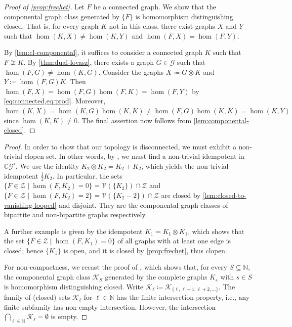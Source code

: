 \documentclass[11pt]{scrartcl}
\theoremstyle{definition}
\theoremstyle{plain}
\theoremstyle{remark}
\newcommand{\lG}{\mathcal{G}^\circ}
\newcommand{\G}{\mathcal{G}}
\newcommand{\Z}{\mathcal{Z}}
\begin{document}
    
	\begin{proof}[Proof of \cref{prop:frechet}]
		Let $F$ be a connected graph.
		We show that the componental graph class generated by $\{F\}$ is homomorphism distinguishing closed.
		That is, for every graph $K$ not in this class, there exist graphs $X$ and $Y$ such that $\hom(K, X) \neq \hom(K, Y)$ and $\hom(F, X) = \hom(F, Y)$.
		
		By \cref{lem:cl-componental}, it suffices to consider a connected graph $K$ such that $F \not\cong K$.
		By \cref{thm:dual-lovasz},
		there exists a graph $G \in \G$ such that $\hom(F, G) \neq \hom(K, G)$.
		Consider the graphs $X \coloneqq G \otimes K$ and $Y \coloneqq \hom(F, G) K$.
		Then $\hom(F, X) = \hom(F, G) \hom(F, K) = \hom(F, Y)$ by \cref{eq:connected,eq:prod}.
		Moreover, $\hom(K, X) = \hom(K, G) \hom(K, K) \neq \hom(F, G) \hom(K, K) = \hom(K, Y)$
		since $\hom(K, K) \neq 0$.
		The final assertion now follows from \cref{lem:componental-closed}. 
	\end{proof}
    \propDisconnected*
	\begin{proof}
		In order to show that our topology is disconnected, we must exhibit a non-trivial clopen set. 
		In other words, by \cite[Lemma 1.1]{milne_basic_2012}, we must find a non-trivial idempotent in $\mathbb{C}\lG$.
		We use the identity $K_2 \otimes K_2 = K_2 + K_2$, which yields the non-trivial idempotent $\frac12 K_2$. In particular, the sets $\{F \in \Z \mid \hom(F, K_2) = 0\} = \mathcal{V}(\{K_2\}) \cap \Z$ and $\{F \in \Z  \mid \hom(F, K_2) = 2\} = \mathcal{V}(\{K_2 - 2\}) \cap \Z$ are closed by \cref{lem:closed-to-vanishing-looped} and disjoint. They are the componental graph classes of bipartite and non-bipartite graphs respectively.

		A further example is given by the idempotent $K_1 = K_1 \otimes K_1$, which shows that the set  $\{F \in \Z \mid \hom(F, K_1) = 0\}$ of all graphs with at least one edge is closed; hence $\{K_1\}$ is open, and it is closed by \cref{prop:frechet}, thus clopen.

		For non-compactness, we recast the proof of \cite[Theorem~6.15]{roberson_oddomorphisms_2022}, which shows that, for every $S \subseteq \mathbb{N}$, the componental graph class $\mathcal{K}_S$ generated by the complete graphs $K_s$ with $s \in S$ is homomorphism distinguishing closed.
		Write $\mathcal{K}_\ell \coloneqq \mathcal{K}_{\{\ell, \ell+1, \ell+2, \dots \}}$.
		The family of (closed) sets $\mathcal{K}_\ell$ for $\ell \in \mathbb{N}$ has the finite intersection property, i.e., any finite subfamily has non-empty intersection.
		However, the intersection $\bigcap_{\ell \in \mathbb{N}} \mathcal{K}_\ell = \emptyset$ is empty.
	\end{proof}
\end{document}
